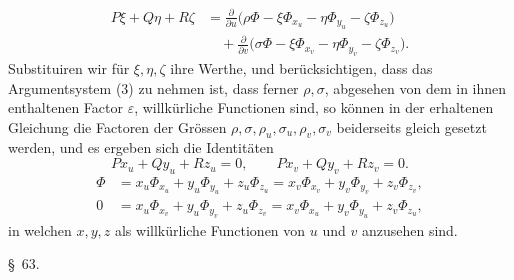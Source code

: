 \documentclass[11pt,a4paper,leqno]{article}
\begin{document}
\[
\begin{aligned}
P\xi+Q\eta+R\zeta
&=\frac{\partial}{\partial u}
\bigl(\rho\Phi-\xi\Phi_{x_u}-\eta\Phi_{y_u}-\zeta\Phi_{z_u}\bigr)\\
&\quad+\frac{\partial}{\partial v}
\bigl(\sigma\Phi-\xi\Phi_{x_v}-\eta\Phi_{y_v}-\zeta\Phi_{z_v}\bigr).
\end{aligned}
\]
Substituiren wir für $\xi,\eta,\zeta$ ihre Werthe, und berücksichtigen, dass das Argumentsystem (3) zu nehmen ist, dass ferner $\rho,\sigma$, abgesehen von dem in ihnen enthaltenen Factor $\varepsilon$, willkürliche Functionen sind, so können in der erhaltenen Gleichung die Factoren der Grössen $\rho,\sigma,\rho_u,\sigma_u,\rho_v,\sigma_v$ beiderseits gleich gesetzt werden, und es ergeben sich die Identitäten
\begin{equation}\tag{4}
Px_u+Qy_u+Rz_u=0,
\qquad
Px_v+Qy_v+Rz_v=0.
\end{equation}
\begin{equation}\tag{5}
\begin{aligned}
\Phi
&=x_u\Phi_{x_u}+y_u\Phi_{y_u}+z_u\Phi_{z_u}
=x_v\Phi_{x_v}+y_v\Phi_{y_v}+z_v\Phi_{z_v},\\
0
&=x_u\Phi_{x_v}+y_u\Phi_{y_v}+z_u\Phi_{z_v}
=x_v\Phi_{x_u}+y_v\Phi_{y_u}+z_v\Phi_{z_u},
\end{aligned}
\end{equation}
in welchen $x,y,z$ als willkürliche Functionen von $u$ und $v$ anzusehen sind.


\begin{center}
{\large \S~63.}
\end{center}
\end{document}
